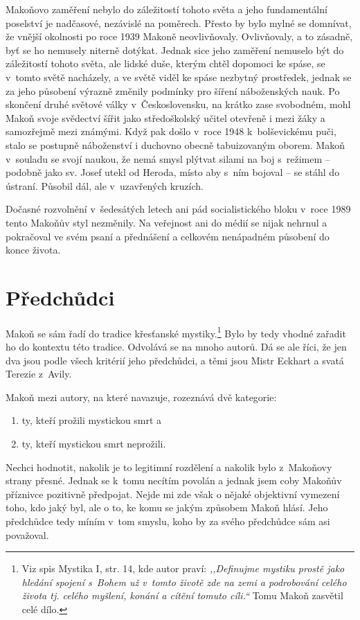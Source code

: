 Makoňovo zaměření nebylo do záležitostí tohoto světa a jeho fundamentální
poselství je nadčasové, nezávislé na poměrech. Přesto by bylo mylné se domnívat,
že vnější okolnosti po roce 1939 Makoně neovlivňovaly. Ovlivňovaly, a to
zásadně, byť se ho nemusely niterně dotýkat. Jednak sice jeho zaměření nemuselo
být do záležitostí tohoto světa, ale lidské duše, kterým chtěl dopomoci ke
spáse, se v~tomto světě nacházely, a ve světě viděl ke spáse nezbytný
prostředek, jednak se za jeho působení výrazně změnily podmínky pro šíření
náboženských nauk.\cite{nevspor2007vceska} Po skončení druhé světové války v~Československu, na krátko
zase svobodném, mohl Makoň svoje svědectví šířit jako středoškolský učitel
otevřeně i mezi žáky a samozřejmě mezi známými. Když pak došlo v~roce 1948
k~bolševickému puči, stalo se postupně náboženství i duchovno obecně
tabuizovaným oborem.\cite{kaplan1993stat} Makoň v~souladu se svojí naukou, že nemá smysl plýtvat
silami na boj s~režimem -- podobně jako sv. Josef utekl od Heroda, místo aby
s~ním bojoval -- se stáhl do ústraní. Působil dál, ale v~uzavřených kruzích.

Dočasné rozvolnění v~šedesátých letech ani pád socialistického bloku v~roce 1989
tento Makoňův styl nezměnily. Na veřejnost ani do médií se nijak nehrnul a
pokračoval ve svém psaní a přednášení a celkovém nenápadném působení do konce
života.

\section{Předchůdci}

Makoň se sám řadí do tradice křesťanské mystiky.\footnote{Viz spis Mystika I,
str. 14, kde autor praví: \textit{,,Definujme mystiku prostě
jako hledání spojení s~Bohem už v~tomto životě zde na zemi a
podrobování celého života tj. celého myšlení, konání a cítění
tomuto cíli.``} Tomu Makoň zasvětil celé dílo.} Bylo by tedy vhodné zařadit ho
do kontextu této tradice. Odvolává se na mnoho autorů. Dá se ale říci, že jen
dva jsou podle všech kritérií jeho předchůdci, a těmi jsou Mistr Eckhart a svatá
Terezie z~Avily.

Makoň mezi autory, na které navazuje, rozeznává dvě kategorie:
\begin{enumerate}
\item{ty, kteří prožili mystickou smrt a}
\item{ty, kteří mystickou smrt neprožili.}
\end{enumerate}
Nechci hodnotit, nakolik je to legitimní rozdělení a nakolik bylo
z~Makoňovy strany přesné. Jednak se k~tomu necítím povolán a jednak jsem coby
Makoňův příznivce pozitivně předpojat. Nejde mi zde však o nějaké objektivní
vymezení toho, kdo jaký byl, ale o to, ke komu se jakým způsobem Makoň hlásí.
Jeho předchůdce tedy míním v~tom smyslu, koho by za svého předchůdce sám asi
považoval.

